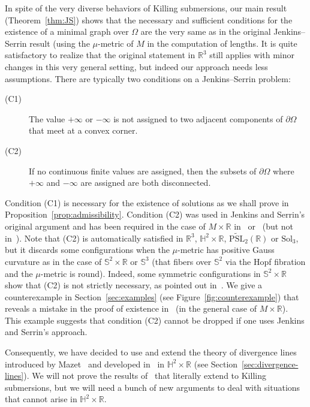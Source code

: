 \documentclass[a4paper,10pt,reqno]{amsart}
\newcommand{\R}{\mathbb{R}}
\theoremstyle{definition}
\theoremstyle{remark}
\numberwithin{equation}{section}
\begin{document}
In spite of the very diverse behaviors of Killing submersions, our main result (Theorem~\ref{thm:JS}) shows that the necessary and sufficient conditions for the existence of a minimal graph over $\Omega$ are the very same as in the original Jenkins--Serrin result (using the $\mu$-metric of $M$ in the computation of lengths. It is quite satisfactory to realize that the original statement in $\R^3$ still applies with minor changes in this very general setting, but indeed our approach needs less assumptions. There are typically two conditions on a Jenkins--Serrin problem:
\begin{description}
	\item[(C1)] The value $+\infty$ or $-\infty$ is not assigned to two adjacent components of $\partial\Omega$ that meet at a convex corner.
	\item[(C2)] If no continuous finite values are assigned, then the subsets of $\partial\Omega$ where $+\infty$ and $-\infty$ are assigned are both disconnected.
\end{description}
Condition (C1) is necessary for the existence of solutions  as we shall prove in Proposition~\ref{prop:admissibility}. Condition (C2) was used in Jenkins and Serrin's original argument and has been required in the case of $M\times\R$ in~\cite{Pin} or~\cite{MRR} (but not in~\cite{EM}). Note that (C2) is automatically satisfied in $\R^3$, $\mathbb{H}^2\times\mathbb{R}$, $\widetilde{\mathrm{PSL}}_2(\R)$ or $\mathrm{Sol}_3$, but it discards some configurations when the $\mu$-metric has positive Gauss curvature as in the case of $\mathbb{S}^2\times\R$ or $\mathbb{S}^3$ (that fibers over $\mathbb{S}^2$ via the Hopf fibration and the $\mu$-metric is round). Indeed, some symmetric configurations in $\mathbb{S}^2\times\R$ show that (C2) is not strictly necessary, as pointed out in~\cite[Rmk.~3.5]{MRR}. We give a counterexample in Section~\ref{sec:examples} (see Figure~\ref{fig:counterexample}) that reveals a mistake in the proof of existence in~\cite{MRR} (in the general case of $M\times\R$). This example suggests that condition (C2) cannot be dropped if one uses Jenkins and Serrin's approach.

Consequently, we have decided to use and extend the theory of divergence lines introduced by Mazet~\cite{Mazet} and developed in~\cite{MRR} in $\mathbb{H}^2\times\mathbb{R}$ (see Section~\ref{sec:divergence-lines}). We will not prove the results of~\cite{MRR} that literally extend to Killing submersions, but we will need a bunch of new arguments to deal with situations that cannot arise in $\mathbb{H}^2\times\R$. 
\end{document}
